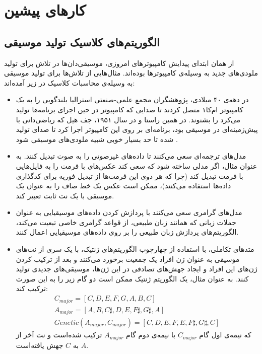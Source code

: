\chapter{کارهای پیشین}

\section{الگوریتم‌های کلاسیک تولید موسیقی}

از همان ابتدای پیدایش کامپیوترهای امروزی، موسیقی‌دان‌ها در تلاش برای تولید ملودی‌های جدید به وسیله‌ی کامپیوترها بوده‌اند.
مثال‌هایی از تلاش‌ها برای تولید موسیقی به وسیله‌ی محاسبات کلاسیک در زیر آمده‌اند:

\begin{itemize}
    \item 
    در دهه‌ی ۴۰ میلادی، پژوهشگران مجمع علمی-صنعتی استرالیا بلندگویی را به یک کامپیوتر ام‌کا۱ متصل کردند تا صدایی که کامپیوتر در حین اجرای برنامه‌ها تولید می‌کرد را بشنوند. در همین راستا و در سال ۱۹۵۱، جف هیل که ریاضی‌دانی با پیش‌زمینه‌ای در موسیقی بود، برنامه‌ای بر روی این کامپیوتر اجرا کرد تا صدای تولید شده تا حد بسیار خوبی شبیه ملودی‌های موسیقی شود
\cite{CSIR_music}.

\item
مدل‌های ترجمه‌ای سعی می‌کنند تا داده‌های غیرصوتی را به صوت تبدیل کنند. به عنوان مثال، اگر مدلی ساخته شود که سعی کند عکس‌های با فرمت 
را به فایل‌هایی با فرمت
تبدیل کند (چرا که هر دوی این فرمت‌ها از تبدیل فوریه برای کدگذاری داده‌ها استفاده می‌کنند)، ممکن است عکس یک خط صاف را به عنوان یک موسیقی با یک نت ثابت تعبیر کند.

\item
مدل‌های گرامری سعی می‌کنند با پردازش کردن داده‌های موسیقیایی به عنوان جملات زبانی که همانند زبان طبیعی، از قواعد گرامری خاصی تبعیت می‌کند، الگوریتم‌های پردازش زبان طبیعی را بر روی داده‌های موسیقیایی اعمال کنند.

\item
متدهای تکاملی، با استفاده از چهارچوب الگوریتم‌های ژنتیک، با یک سری از نت‌های موسیقی به عنوان ژن افراد یک جمعیت برخورد می‌کنند و بعد از ترکیب کردن ژن‌های این افراد و ایجاد جهش‌های تصادفی در این ژن‌ها، موسیقی‌های جدیدی تولید کنند.
به عنوان مثال، یک الگوریتم ژنتیک ممکن است دو گام زیر را به این صورت ترکیب کند:
\begin{equation}
\begin{gathered}
    C_{major} = [C, D, E, F, G, A, B, C]\\[3pt]
    A_{major} = [A, B, C\sharp, D, E, F\sharp, G\sharp, A] \\
    Genetic(A_{major}, C_{major}) = [C, D, E, F, E, F\sharp, G\sharp, C] 
\end{gathered}
\end{equation}
که نیمه‌ی اول گام 
$C_{major}$
با نیمه‌ی دوم گام
$A_{major}$
ترکیب شده‌است و نت آخر از 
$A$
به
$C$
جهش یافته‌است.


\end{itemize}
